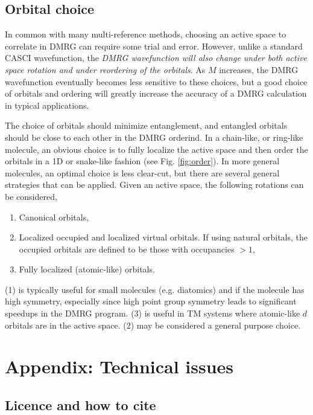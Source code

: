 \documentclass[letterpaper,12pt,aps, pra]{revtex4-1}
\begin{document}
\subsection{Orbital choice}\label{sec:appendix2}

In common with many multi-reference methods, choosing an active space to correlate in DMRG can
require some trial and error. However, unlike a standard CASCI wavefunction, the {\it DMRG wavefunction will also  change under both active space rotation and under reordering of the orbitals}.
As $M$ increases, the DMRG wavefunction eventually becomes less sensitive to these choices, but
a good choice of orbitals and ordering will greatly increase the accuracy of a DMRG calculation in typical applications. 

The choice of orbitals should
minimize entanglement, and entangled orbitals should be close to each other in the DMRG orderind.
In a chain-like, or ring-like molecule, an obvious choice is to fully localize the active space and then order the orbitals in a 1D or snake-like fashion (see Fig. \ref{fig:order}). In
more general molecules, an optimal choice is less clear-cut, but there are several general strategies that can be applied. Given an active space, the following rotations can be considered,
\begin{enumerate}
\item Canonical orbitals,
\item Localized occupied and localized virtual orbitals. If using natural orbitals, the occupied orbitals are defined to be those with occupancies $>1$,
\item Fully localized (atomic-like) orbitals.
\end{enumerate}
(1) is typically useful for small molecules (e.g. diatomics) and if the molecule has high symmetry, especially since high point group symmetry leads to significant speedups in the DMRG program.
(3) is useful in TM systems where atomic-like $d$ orbitals are in the active space. (2) may be considered a general purpose choice. 


\section{Appendix: Technical issues}

\subsection{Licence and how to cite}\label{sec:papers}
\end{document}
